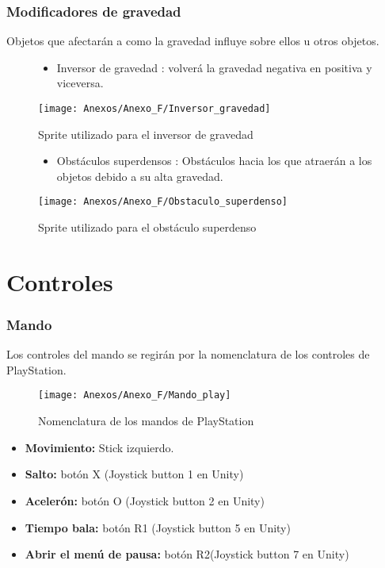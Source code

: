 \subsubsection{Modificadores de gravedad}
Objetos que afectarán a como la gravedad influye sobre ellos u otros objetos.
\begin{figure}[h]
\begin{itemize}
\item
Inversor de gravedad \footnotemark : volverá la gravedad negativa en positiva y viceversa.
\end{itemize}

\centering
\texttt{[image: Anexos/Anexo\_F/Inversor\_gravedad]}
\caption{Sprite utilizado para el inversor de gravedad}
\begin{itemize}
\item
Obstáculos superdensos \footnotemark : Obstáculos hacia los que atraerán a los objetos debido a su alta gravedad.
\end{itemize}
\centering
\texttt{[image: Anexos/Anexo\_F/Obstaculo\_superdenso]}
\caption{Sprite utilizado para el obstáculo superdenso}
\end{figure}

\clearpage
\section{Controles}
\subsubsection{Mando}
Los controles del mando se regirán por la nomenclatura de los controles de PlayStation.

\begin{figure}[h]
\centering
\texttt{[image: Anexos/Anexo\_F/Mando\_play]}
\caption{Nomenclatura de los mandos de PlayStation}
\end{figure}

\begin{itemize}
\item
\textbf{Movimiento:} Stick izquierdo.
\item
\textbf{Salto:} botón X (Joystick button 1 en Unity)
\item
\textbf{Acelerón:} botón O (Joystick button 2 en Unity)
\item
\textbf{Tiempo bala:} botón R1 (Joystick button 5 en Unity)
\item
\textbf{Abrir el menú de pausa:} botón R2(Joystick button 7 en Unity)
\end{itemize}

